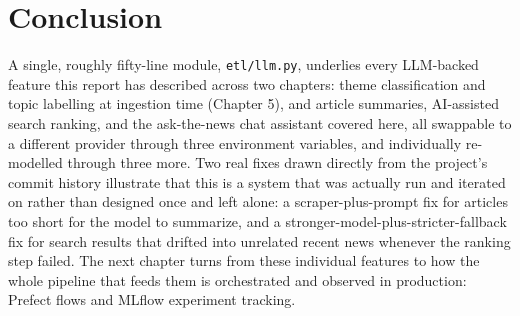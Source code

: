 \section{Conclusion}
\begin{sloppypar}
A single, roughly fifty-line module, \texttt{etl/llm.py}, underlies every LLM-backed feature this report has described across two chapters: theme classification and topic labelling at ingestion time (Chapter 5), and article summaries, AI-assisted search ranking, and the ask-the-news chat assistant covered here, all swappable to a different provider through three environment variables, and individually re-modelled through three more. Two real fixes drawn directly from the project's commit history illustrate that this is a system that was actually run and iterated on rather than designed once and left alone: a scraper-plus-prompt fix for articles too short for the model to summarize, and a stronger-model-plus-stricter-fallback fix for search results that drifted into unrelated recent news whenever the ranking step failed. The next chapter turns from these individual features to how the whole pipeline that feeds them is orchestrated and observed in production: Prefect flows and MLflow experiment tracking.
\end{sloppypar}
